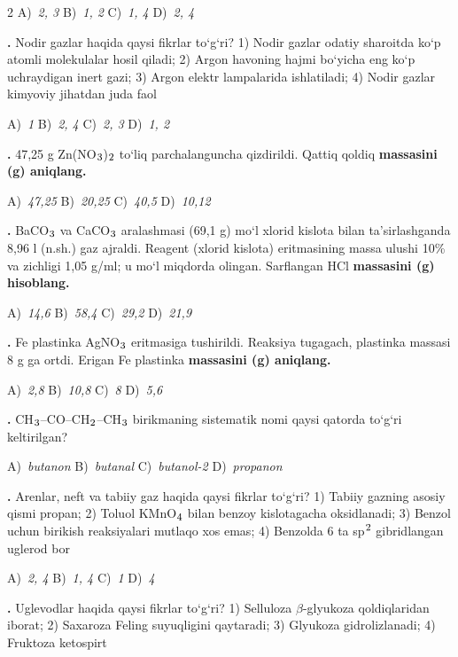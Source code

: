 \documentclass[11pt,a4paper]{article}
\renewcommand{\textsubscript}[1]{\ensuremath{_{\text{\fontsize{8}{8}\selectfont #1}}}}
\renewcommand{\textsuperscript}[1]{\ensuremath{^{\text{\fontsize{8}{8}\selectfont #1}}}}
\newcommand{\qn}[1]{\textbf{\fontsize{11.5}{13}\selectfont #1}}
\newcommand{\qsep}{\par\vspace{13pt}}
\begin{document}
\begin{multicols}{2}
\noindent A)~\textsl{2, 3} \hfill B)~\textsl{1, 2} \hfill C)~\textsl{1, 4} \hfill D)~\textsl{2, 4}\par
\qsep
\noindent\qn{16.} Nodir gazlar haqida qaysi fikrlar to`g`ri? 1) Nodir gazlar odatiy sharoitda ko`p atomli molekulalar hosil qiladi; 2) Argon havoning hajmi bo`yicha eng ko`p uchraydigan inert gazi; 3) Argon elektr lampalarida ishlatiladi; 4) Nodir gazlar kimyoviy jihatdan juda faol

\noindent A)~\textsl{1} \hfill B)~\textsl{2, 4} \hfill C)~\textsl{2, 3} \hfill D)~\textsl{1, 2}\par
\qsep
\noindent\qn{17.} 47,25 g Zn(NO\textsubscript{3})\textsubscript{2} to`liq parchalanguncha qizdirildi. Qattiq qoldiq \textbf{massasini (g) aniqlang.}

\noindent A)~\textsl{47,25} \hfill B)~\textsl{20,25} \hfill C)~\textsl{40,5} \hfill D)~\textsl{10,12}\par
\qsep
\noindent\qn{18.} BaCO\textsubscript{3} va CaCO\textsubscript{3} aralashmasi (69,1 g) mo`l xlorid kislota bilan ta'sirlashganda 8,96 l (n.sh.) gaz ajraldi. Reagent (xlorid kislota) eritmasining massa ulushi 10\% va zichligi 1,05 g/ml; u mo`l miqdorda olingan. Sarflangan HCl \textbf{massasini (g) hisoblang.}

\noindent A)~\textsl{14,6} \hfill B)~\textsl{58,4} \hfill C)~\textsl{29,2} \hfill D)~\textsl{21,9}\par
\qsep
\noindent\qn{19.} Fe plastinka AgNO\textsubscript{3} eritmasiga tushirildi. Reaksiya tugagach, plastinka massasi 8 g ga ortdi. Erigan Fe plastinka \textbf{massasini (g) aniqlang.}

\noindent A)~\textsl{2,8} \hfill B)~\textsl{10,8} \hfill C)~\textsl{8} \hfill D)~\textsl{5,6}\par
\qsep
\noindent\qn{20.} CH\textsubscript{3}--CO--CH\textsubscript{2}--CH\textsubscript{3} birikmaning sistematik nomi qaysi qatorda to`g`ri keltirilgan?

\noindent A)~\textsl{butanon} \hfill B)~\textsl{butanal} \hfill C)~\textsl{butanol-2} \hfill D)~\textsl{propanon}\par
\qsep
\noindent\qn{21.} Arenlar, neft va tabiiy gaz haqida qaysi fikrlar to`g`ri? 1) Tabiiy gazning asosiy qismi propan; 2) Toluol KMnO\textsubscript{4} bilan benzoy kislotagacha oksidlanadi; 3) Benzol uchun birikish reaksiyalari mutlaqo xos emas; 4) Benzolda 6 ta sp\textsuperscript{2} gibridlangan uglerod bor

\noindent A)~\textsl{2, 4} \hfill B)~\textsl{1, 4} \hfill C)~\textsl{1} \hfill D)~\textsl{4}\par
\qsep
\noindent\qn{22.} Uglevodlar haqida qaysi fikrlar to`g`ri? 1) Selluloza $\beta$-glyukoza qoldiqlaridan iborat; 2) Saxaroza Feling suyuqligini qaytaradi; 3) Glyukoza gidrolizlanadi; 4) Fruktoza ketospirt


\end{multicols}
\end{document}
